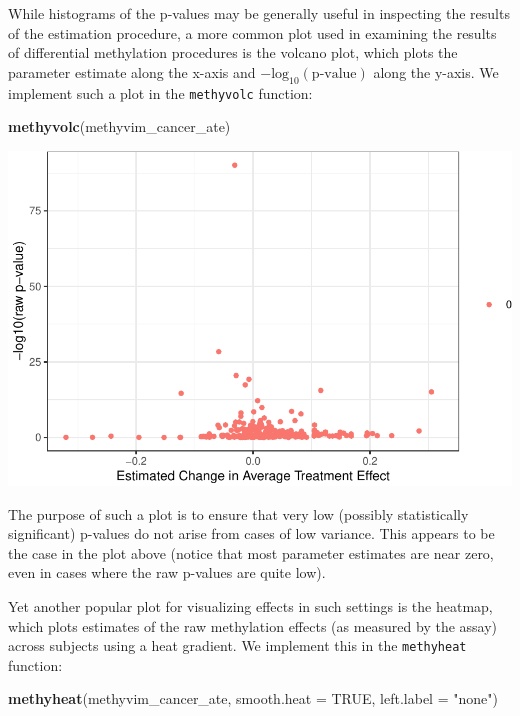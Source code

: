 \documentclass[9pt,a4paper,]{extarticle}
\newenvironment{Shaded}{\begin{snugshade}}{\end{snugshade}}
\newcommand{\DataTypeTok}[1]{\textcolor[rgb]{0.13,0.29,0.53}{#1}}
\newcommand{\KeywordTok}[1]{\textcolor[rgb]{0.13,0.29,0.53}{\textbf{#1}}}
\newcommand{\NormalTok}[1]{#1}
\newcommand{\OtherTok}[1]{\textcolor[rgb]{0.56,0.35,0.01}{#1}}
\newcommand{\StringTok}[1]{\textcolor[rgb]{0.31,0.60,0.02}{#1}}
\theoremstyle{definition}
\theoremstyle{definition}
\theoremstyle{definition}
\theoremstyle{remark}
\begin{document}
While histograms of the p-values may be generally useful in inspecting the
results of the estimation procedure, a more common plot used in examining the
results of differential methylation procedures is the volcano plot, which plots
the parameter estimate along the x-axis and \(-\text{log}_{10}(\text{p-value})\)
along the y-axis. We implement such a plot in the \texttt{methyvolc} function:

\begin{Shaded}
\begin{Highlighting}[]
\KeywordTok{methyvolc}\NormalTok{(methyvim_cancer_ate)}
\end{Highlighting}
\end{Shaded}

\begin{center}\includegraphics{paper_BiocF1000_files/figure-latex/methyvim-volcano-1} \end{center}

The purpose of such a plot is to ensure that very low (possibly statistically
significant) p-values do not arise from cases of low variance. This appears to
be the case in the plot above (notice that most parameter estimates are near
zero, even in cases where the raw p-values are quite low).

Yet another popular plot for visualizing effects in such settings is the
heatmap, which plots estimates of the raw methylation effects (as measured by
the assay) across subjects using a heat gradient. We implement this in the
\texttt{methyheat} function:

\begin{Shaded}
\begin{Highlighting}[]
\KeywordTok{methyheat}\NormalTok{(methyvim_cancer_ate, }\DataTypeTok{smooth.heat =} \OtherTok{TRUE}\NormalTok{, }\DataTypeTok{left.label =} \StringTok{"none"}\NormalTok{)}
\end{Highlighting}
\end{Shaded}
\end{document}
